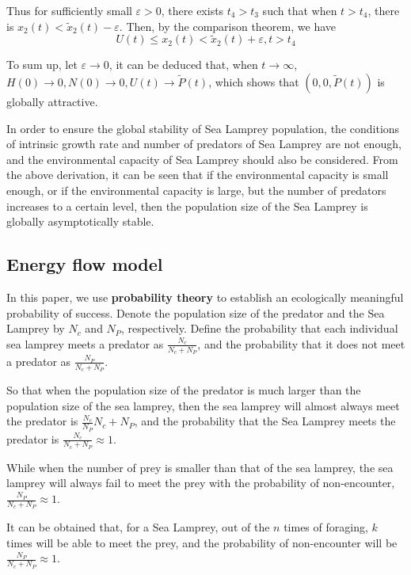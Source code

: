 \documentclass{mcmthesis}
\begin{document}
Thus for sufficiently small $\varepsilon>0$, there exists $t_{4}>t_{3}$ such that when $t>t_{4}$, there is $x_{2}(t)<\tilde{x}_{2}(t)-\varepsilon$.
Then, by the comparison theorem, we have
\begin{equation}
  U(t) \leq x_{2}(t)<\tilde{x}_{2}(t)+\varepsilon, t>t_{4}
\end{equation}

To sum up, let $\varepsilon \rightarrow 0$, it can be deduced that,
when $t \rightarrow \infty$, $H(0) \rightarrow 0, N(0) \rightarrow 0, U(t) \rightarrow \tilde{P}(t)$,
which shows that $(0, 0, \tilde{P}(t))$ is globally attractive.

In order to ensure the global stability of Sea Lamprey population,
the conditions of intrinsic growth rate and number of predators of Sea Lamprey are not enough,
and the environmental capacity of Sea Lamprey should also be considered.
From the above derivation, it can be seen that if the environmental capacity is small enough,
or if the environmental capacity is large, but the number of predators increases to a certain level,
then the population size of the Sea Lamprey is globally asymptotically stable.

\subsection{Energy flow model}

In this paper, we use \textbf{probability theory} to establish an ecologically meaningful probability of success.
Denote the population size of the predator and the Sea Lamprey by $N_{c}$ and $N_{P}$, respectively.
Define the probability that each individual sea lamprey meets a predator as $\frac{N_{c}}{N_{c}+N_{P}}$,
and the probability that it does not meet a predator as $\frac{N_{P}}{N_{c}+N_{P}}$.

So that when the population size of the predator is much larger than the population size of the sea lamprey,
then the sea lamprey will almost always meet the predator is $\frac{N_{c}}{N_{P}}{N_{c}+N_{P}}$,
and the probability that the Sea Lamprey meets the predator is $\frac{N_{c}}{N_{c}+N_{P}}\approx 1$.

While when the number of prey is smaller than that of the sea lamprey,
the sea lamprey will always fail to meet the prey with the probability of non-encounter, $\frac{N_{P}}{N_{c}+N_{P}}\approx 1$.

It can be obtained that, for a Sea Lamprey, out of the $n$ times of foraging, $k$ times will be able to meet the prey,
and the probability of non-encounter will be $\frac{N_{P}}{N_{c}+N_{P}}\approx 1$.
\end{document}
